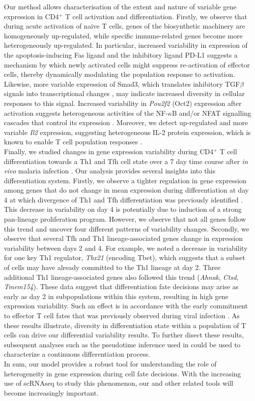 Our method allows characterisation of the extent and nature of variable gene expression in CD4$^+$ T cell activation and differentiation. Firstly, we observe that during acute activation of naive T cells, genes of the biosynthetic machinery are homogeneously up-regulated, while specific immune-related genes become more heterogeneously up-regulated. In particular, increased variability in expression of the apoptosis-inducing Fas ligand \citep{Strasser2009} and the inhibitory ligand PD-L1 \citep{Chikuma2016} suggests a mechanism by which newly activated cells might suppress re-activation of effector cells, thereby dynamically modulating the population response to activation. Likewise, more variable expression of Smad3, which translates inhibitory TGF$\beta$ signals into transcriptional changes \citep{Delisle2013}, may indicate increased diversity in cellular responses to this signal. Increased variability in \textit{Pou2f2} (Oct2) expression after activation suggests heterogeneous activities of the NF-$\kappa$B and/or NFAT signalling cascades that control its expression \citep{Mueller2013}.
Moreover, we detect up-regulated and more variable \textit{Il2} expression, suggesting heterogeneous IL-2 protein expression, which is known to enable T cell population responses \citep{Fuhrmann2016}. \\

Finally, we studied changes in gene expression variability during CD4$^+$ T cell differentiation towards a Th1 and Tfh cell state over a 7 day time course after \textit{in vivo} malaria infection \citep{Lonnberg2017}. Our analysis provides several insights into this differentiation system. Firstly, we observe a tighter regulation in gene expression among genes that do not change in mean expression during differentiation at day 4 at which divergence of Th1 and Tfh differentiation was previously identified \citep{Lonnberg2017}. This decrease in variability on day 4 is potentially due to induction of a strong pan-lineage proliferation program. However, we observe that not all genes follow this trend and uncover four different patterns of variability changes. Secondly, we observe that several Tfh and Th1 lineage-associated genes change in expression variability between days 2 and 4. For example, we noted a decrease in variability for one key Th1 regulator, \textit{Tbx21} (encoding Tbet), which suggests that a subset of cells may have already committed to the Th1 lineage at day 2. Three additional Th1 lineage-associated genes also followed this trend (\textit{Ahnak}, \textit{Ctsd}, \textit{Tmem154}). These data suggest that differentiation fate decisions may arise as early as day 2 in subpopulations within this system, resulting in high gene expression variability. Such an effect is in accordance with the early commitment to effector T cell fates that was previously observed during viral infection \citep{Choi2011}. As these results illustrate, diversity in differentiation state within a population of T cells can drive our differential variability results. To further disect these results, subsequent analyses such as the pseudotime inference used in \cite{Lonnberg2017} could be used to characterize a continuous differentiation process.\\

In sum, our model provides a robust tool for understanding the role of heterogeneity in gene expression during cell fate decisions. With the increasing use of scRNAseq to study this phenomenon, our and other related tools will become increasingly important.


